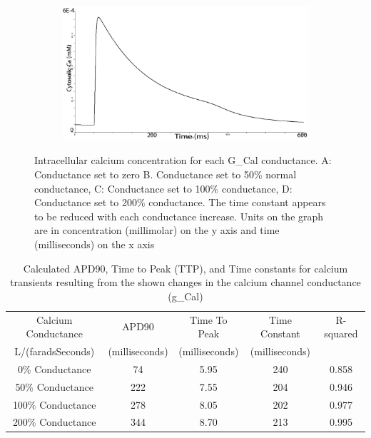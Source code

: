 \documentclass[11pt]{article}
\begin{document}
\begin{figure}[H]
\begin{subfigure}{0.45\textwidth}
		\caption{}
		\label{fig:left}
	\end{subfigure}
	\begin{subfigure}{0.45\textwidth}
		\centering
		\includegraphics[width = \textwidth]{figs/200gcaledit.png}
		\caption{}
		\label{fig:right}
	\end{subfigure}
	\caption{Intracellular calcium concentration for each G\_Cal conductance. A: Conductance set to zero B. Conductance set to 50\% normal conductance, C: Conductance set to 100\% conductance, D: Conductance set to 200\% conductance. The time constant appears to be reduced with each conductance increase. Units on the graph are in concentration (millimolar) on the y axis and time (milliseconds) on the x axis}
	\label{fig:exp1}
\end{figure}

\begin{table}[H]
	\centering
	\caption{Calculated APD90, Time to Peak (TTP), and Time constants for calcium transients resulting from the shown changes in the calcium channel conductance (g\_Cal)}
	\label{tab:calcium}
	\begin{tabular}{ccccc}
		\hline \hline
		Calcium Conductance & APD90  & Time To Peak  & Time Constant & R-squared\\ 
		L/(faradsSeconds) & (milliseconds) & (milliseconds)& (milliseconds)& \\
		\hline
		0\% Conductance & 74& 5.95&240 &0.858 \\ 
		50\% Conductance &222 &7.55 &204 &0.946 \\ 
		
		100\% Conductance & 278 &8.05 & 202& 0.977\\ 
		
		200\% Conductance& 344 & 8.70& 213& 0.995\\ 
		
		
		\hline 
		\hline
	\end{tabular} 
\end{table}
\end{document}

